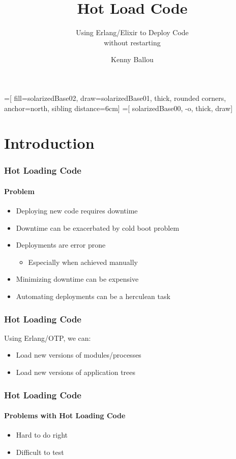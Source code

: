 \documentclass{beamer}
\title{Hot Load Code}
\subtitle{Using Erlang/Elixir to Deploy Code \\{}
without restarting}
\author[Ballou]{Kenny Ballou}
\institute[zData]{%
    \inst{}%
    zData, Inc.
}
\begin{document}
=[%
    fill=solarizedBase02,
    draw=solarizedBase01,
    thick,
    rounded corners,
    anchor=north,
    sibling distance=6cm]
=[%
    solarizedBase00,
    -o,
    thick,
    draw]

\begin{frame}[label=titleslide]
\titlepage{}
\end{frame}

\begin{frame}
\tableofcontents[subsectionstyle=hide]
\end{frame}

\section{Introduction}

\begin{frame}
\frametitle{Hot Loading Code}
\framesubtitle{Problem}
\begin{itemize}
\item{Deploying new code requires downtime}
\item{Downtime can be exacerbated by cold boot problem}
\item{Deployments are error prone}
\begin{itemize}
\item{Especially when achieved manually}
\end{itemize}
\item{Minimizing downtime can be expensive}
\item{Automating deployments can be a herculean task}
\end{itemize}
\end{frame}

\begin{frame}
\frametitle{Hot Loading Code}
Using Erlang/OTP, we can:
\begin{itemize}
\item{Load new versions of modules/processes}
\item{Load new versions of application trees}
\end{itemize}
\end{frame}

\begin{frame}
\frametitle{Hot Loading Code}
\framesubtitle{Problems with Hot Loading Code}
\begin{itemize}
\item{Hard to do right}
\item{Difficult to test}
\end{itemize}
\end{frame}
\end{document}
